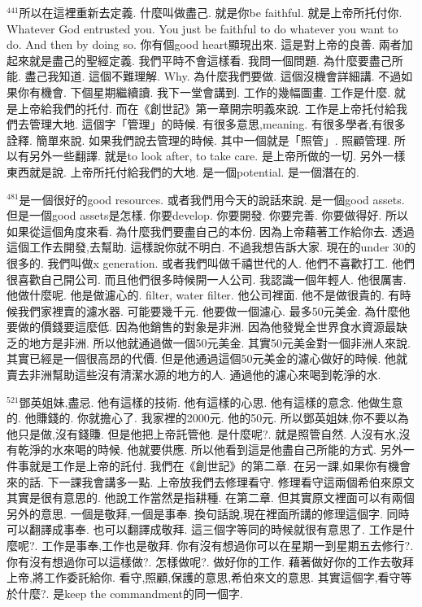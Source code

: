 \documentclass{book}
\begin{document}
$^{441}$所以在這裡重新去定義.
什麼叫做盡己.
就是你be faithful.
就是上帝所托付你.
Whatever God entrusted you.
You just be faithful to do whatever you want to do.
And then by doing so.
你有個good heart顯現出來.
這是對上帝的良善.
兩者加起來就是盡己的聖經定義.
我們平時不會這樣看.
我問一個問題.
為什麼要盡己所能.
盡己我知道.
這個不難理解.
Why.
為什麼我們要做.
這個沒機會詳細講.
不過如果你有機會.
下個星期繼續讀.
我下一堂會講到.
工作的幾幅圖畫.
工作是什麼.
就是上帝給我們的托付.
而在《創世記》第一章開宗明義來說.
工作是上帝托付給我們去管理大地.
這個字「管理」的時候.
有很多意思,meaning.
有很多學者,有很多詮釋.
簡單來說.
如果我們說去管理的時候.
其中一個就是「照管」.
照顧管理.
所以有另外一些翻譯.
就是to look after, to take care.
是上帝所做的一切.
另外一樣東西就是說.
上帝所托付給我們的大地.
是一個potential.
是一個潛在的.

$^{481}$是一個很好的good resources.
或者我們用今天的說話來說.
是一個good assets.
但是一個good assets是怎樣.
你要develop.
你要開發.
你要完善.
你要做得好.
所以如果從這個角度來看.
為什麼我們要盡自己的本份.
因為上帝藉著工作給你去.
透過這個工作去開發,去幫助.
這樣說你就不明白.
不過我想告訴大家.
現在的under 30的很多的.
我們叫做x generation.
或者我們叫做千禧世代的人.
他們不喜歡打工.
他們很喜歡自己開公司.
而且他們很多時候開一人公司.
我認識一個年輕人.
他很厲害.
他做什麼呢.
他是做濾心的.
filter, water filter.
他公司裡面.
他不是做很貴的.
有時候我們家裡賣的濾水器.
可能要幾千元.
他要做一個濾心.
最多50元美金.
為什麼他要做的價錢要這麼低.
因為他銷售的對象是非洲.
因為他發覺全世界食水資源最缺乏的地方是非洲.
所以他就通過做一個50元美金.
其實50元美金對一個非洲人來說.
其實已經是一個很高昂的代價.
但是他通過這個50元美金的濾心做好的時候.
他就賣去非洲幫助這些沒有清潔水源的地方的人.
通過他的濾心來喝到乾淨的水.

$^{521}$鄧英姐妹,盡忌.
他有這樣的技術.
他有這樣的心思.
他有這樣的意念.
他做生意的.
他賺錢的.
你就擔心了.
我家裡的2000元.
他的50元.
所以鄧英姐妹,你不要以為他只是做,沒有錢賺.
但是他把上帝託管他.
是什麼呢?.
就是照管自然.
人沒有水,沒有乾淨的水來喝的時候.
他就要供應.
所以他看到這是他盡自己所能的方式.
另外一件事就是工作是上帝的託付.
我們在《創世記》的第二章.
在另一課,如果你有機會來的話.
下一課我會講多一點.
上帝放我們去修理看守.
修理看守這兩個希伯來原文其實是很有意思的.
他說工作當然是指耕種.
在第二章.
但其實原文裡面可以有兩個另外的意思.
一個是敬拜,一個是事奉.
換句話說,現在裡面所講的修理這個字.
同時可以翻譯成事奉.
也可以翻譯成敬拜.
這三個字等同的時候就很有意思了.
工作是什麼呢?.
工作是事奉,工作也是敬拜.
你有沒有想過你可以在星期一到星期五去修行?.
你有沒有想過你可以這樣做?.
怎樣做呢?.
做好你的工作.
藉著做好你的工作去敬拜上帝,將工作委託給你.
看守,照顧,保護的意思,希伯來文的意思.
其實這個字,看守等於什麼?.
是keep the commandment的同一個字.
\end{document}
